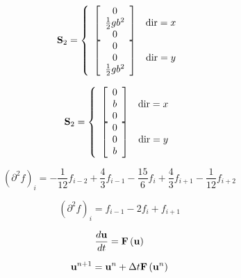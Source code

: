 \documentclass{article}
\begin{document}
\begin{equation} {\bf S}_2 = \left\{ \begin{array}{cc} \left[ \begin{array}{c} 0 \\ \frac{1}{2}gb^2 \\ 0 \end{array}\right] & {\rm dir} = x \\ \left[ \begin{array}{c} 0 \\ 0 \\ \frac{1}{2}gb^2 \end{array}\right] & {\rm dir} = y \end{array} \right. \end{equation}
\pagebreak

\begin{equation} {\bf S}_2 = \left\{ \begin{array}{cc} \left[ \begin{array}{c} 0 \\ b \\ 0 \end{array}\right] & {\rm dir} = x \\ \left[ \begin{array}{c} 0 \\ 0 \\ b \end{array}\right] & {\rm dir} = y \end{array} \right. \end{equation}
\pagebreak

\begin{equation} \left(\partial^2 f\right)_i = -\frac{1}{12}f_{i-2} + \frac{4}{3}f_{i-1} - \frac{15}{6}f_i + \frac{4}{3}f_{i+1} - \frac{1}{12}f_{i+2} \end{equation}
\pagebreak

\begin{equation} \left(\partial^2 f\right)_i = f_{i-1} - 2f_i + f_{i+1} \end{equation}
\pagebreak

\begin{equation} \frac{d{\bf u}}{dt} = {\bf F} \left({\bf u}\right) \end{equation}
\pagebreak

\begin{equation} {\bf u}^{n+1} = {\bf u}^n + \Delta t {\bf F}\left( {\bf u}^n \right) \end{equation}
\pagebreak
\end{document}
